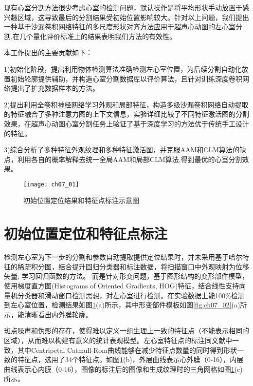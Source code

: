 现有心室分割方法很少考虑心室的检测问题\citep{jixianghu-2016}，默认操作是将平均形状手动放置于感兴趣区域，这导致最后的分割结果受初始位置影响较大。针对以上问题，我们提出一种基于沙漏卷积网络特征的多尺度形状对齐方法应用于超声心动图的左心室分割,在几个量化评价标准上的结果表明我们方法的有效性。

本工作提出的主要贡献如下：

1)初始化阶段，提出利用物体检测算法准确检测左心室位置，为后续分割自动化放置初始轮廓提供辅助，并构造心室分割数据库以评价算法，且针对训练深度卷积网络提出了扩充数据样本的方法。

2)提出利用全卷积神经网络学习外观和局部特征，构造多级沙漏卷积网络自动提取的特征融合了多种注意力图的上下文信息，实验详细比较了不同特征激活图的分割效果，在超声心动图心室分割任务上验证了基于深度学习的方法优于传统手工设计的特征。

3)综合分析了多种特征外观纹理和多种特征激活图，并克服AAM和CLM算法的缺点，利用各自的概率解释去统一全局AAM和局部CLM算法,得到最优的心室分割效果。

\begin{figure}[!htbp]
\centering
\texttt{[image: ch07\_01]}
\caption{初始位置定位结果和特征点标注示意图}
\label{fig:ch07_01}
\end{figure}
\section{初始位置定位和特征点标注}

检测左心室为下一步的分割和参数自动提取提供定位结果时，并未采用基于哈尔特征的稀疏积分图，结合提升回归分类器\citep{Zhou2007}和标注数据，将扫描窗口中外观映射为位移矢量, 学习回归函数的方法。
而是针对形变问题，基于图形结构的变形部件模型，使用梯度直方图(Histograms of Oriented Gradients, HOG)特征\citep{Dalal2005}，结合线性支持向量机分类器和滑动窗口检测思想，对左心室进行检测。在实验数据上能100\%检测到左心室位置，检测结果如图\ref{fig:ch07_01}(a)所示，其中形变部件模板如图\ref{fig:ch07_02}(a)所示，能清晰看出内外膜轮廓。

 

斑点噪声和伪影的存在，使得难以定义一组生理上一致的特征点（不能表示相同的区域），从而难以构建有意义的统计表观模型。左心室特征点的标注同文献中一致，其中Centripetal Catmull-Rom曲线能够在减少特征点数量的同时得到形状一致的特征点，选用了34个特征点。如图\ref{fig:ch07_01}(b)，外层曲线表示心外膜（0-16），内层曲线表示心内膜（0-16），图像的标注后的图像和生成纹理时的三角网格如图\ref{fig:ch07_01}(c)所示。

